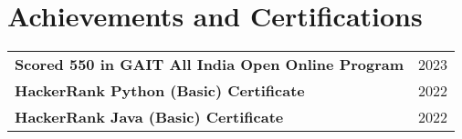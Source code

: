 \documentclass[a4paper,12pt]{article}
\begin{document}
\section{Achievements and Certifications}
\begin{tabularx}{\linewidth}{ @{}l r@{} }
\textbf{Scored 550 in GAIT All India Open Online Program} & \hfill \hspace{6.7cm}2023 \\[3.75pt]
\textbf{HackerRank Python (Basic) Certificate} & \hfill \hspace{6.7cm}2022 \\[3.75pt]
\textbf{HackerRank Java (Basic) Certificate} & \hfill \hspace{6.7cm}2022 \\[3.75pt]
\end{tabularx}

\end{document}

